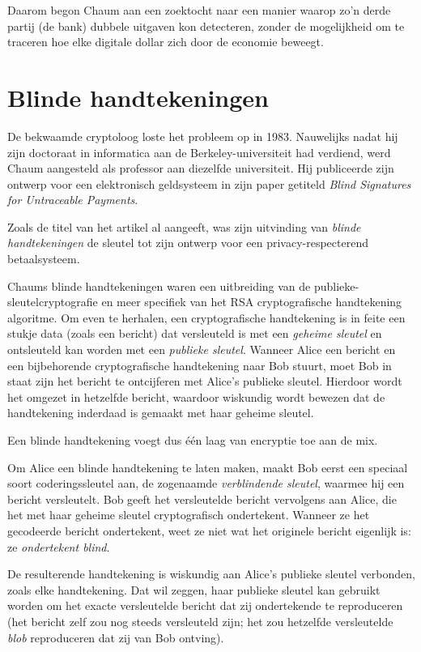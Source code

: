 \documentclass[
  a5paper,
  smalldemyvopaper,11pt,twoside,onecolumn,openright,extrafontsizes,
hidelinks]{memoir}
\begin{document}
Daarom begon Chaum aan een zoektocht naar een manier waarop zo'n derde
partij (de bank) dubbele uitgaven kon detecteren, zonder de mogelijkheid
om te traceren hoe elke digitale dollar zich door de economie beweegt.

\section{Blinde handtekeningen}\label{blinde-handtekeningen}

De bekwaamde cryptoloog loste het probleem op in 1983. Nauwelijks nadat
hij zijn doctoraat in informatica aan de Berkeley-universiteit had
verdiend, werd Chaum aangesteld als professor aan diezelfde
universiteit. Hij publiceerde zijn ontwerp voor een elektronisch
geldsysteem in zijn paper getiteld \emph{Blind Signatures for
Untraceable Payments}.

Zoals de titel van het artikel al aangeeft, was zijn uitvinding van
\emph{blinde handtekeningen} de sleutel tot zijn ontwerp voor een
privacy-respecterend betaalsysteem.

Chaums blinde handtekeningen waren een uitbreiding van de
publieke-sleutelcryptografie en meer specifiek van het RSA
cryptografische handtekening algoritme. Om even te herhalen, een
cryptografische handtekening is in feite een stukje data (zoals een
bericht) dat versleuteld is met een \emph{geheime sleutel} en
ontsleuteld kan worden met een \emph{publieke sleutel}. Wanneer Alice
een bericht en een bijbehorende cryptografische handtekening naar Bob
stuurt, moet Bob in staat zijn het bericht te ontcijferen met Alice's
publieke sleutel. Hierdoor wordt het omgezet in hetzelfde bericht,
waardoor wiskundig wordt bewezen dat de handtekening inderdaad is
gemaakt met haar geheime sleutel.

Een blinde handtekening voegt dus één laag van encryptie toe aan de mix.

Om Alice een blinde handtekening te laten maken, maakt Bob eerst een
speciaal soort coderingssleutel aan, de zogenaamde \emph{verblindende
sleutel}, waarmee hij een bericht versleutelt. Bob geeft het
versleutelde bericht vervolgens aan Alice, die het met haar geheime
sleutel cryptografisch ondertekent. Wanneer ze het gecodeerde bericht
ondertekent, weet ze niet wat het originele bericht eigenlijk is: ze
\emph{ondertekent blind}.

De resulterende handtekening is wiskundig aan Alice's publieke sleutel
verbonden, zoals elke handtekening. Dat wil zeggen, haar publieke
sleutel kan gebruikt worden om het exacte versleutelde bericht dat zij
ondertekende te reproduceren (het bericht zelf zou nog steeds
versleuteld zijn; het zou hetzelfde versleutelde \emph{blob}
reproduceren dat zij van Bob ontving).
\end{document}
